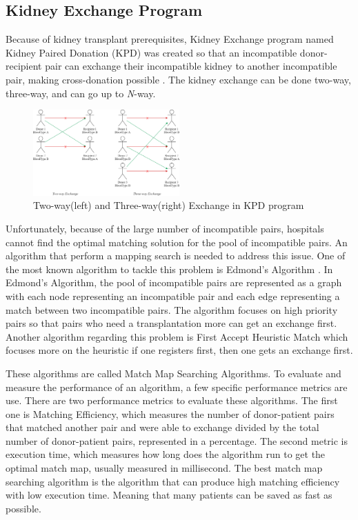 \documentclass[conference]{IEEEtran}
\begin{document}
\subsection{Kidney Exchange Program}
Because of kidney transplant prerequisites, Kidney Exchange program named Kidney Paired Donation (KPD) was created
so that an incompatible donor-recipient pair can exchange their incompatible kidney to another incompatible
pair, making cross-donation possible \cite{raja}. The kidney exchange can be done two-way, three-way, and can
go up to \textit{N}-way.

\begin{figure}[h]
\includegraphics[width=0.5\textwidth]{images/kidney-exchange.png}
\caption{Two-way(left) and Three-way(right) Exchange in KPD program}
\end{figure}

Unfortunately, because of the large number of incompatible pairs, hospitals cannot find the optimal
matching solution for the pool of incompatible pairs. An algorithm that perform a mapping search is needed
to address this issue. One of the most known algorithm to tackle this problem is Edmond's Algorithm \cite{raja}.
In Edmond's Algorithm, the pool of incompatible pairs are represented as a graph with each node representing
an incompatible pair and each edge representing a match between two incompatible pairs. The algorithm focuses on
high priority pairs so that pairs who need a transplantation more can get an exchange first.
Another algorithm regarding this problem is First Accept Heuristic Match \cite{raja} which focuses more on the
heuristic if one registers first, then one gets an exchange first.

These algorithms are called Match Map Searching Algorithms. To evaluate and measure the performance of an algorithm,
a few specific performance metrics are use\cite{tullis}. There are two performance metrics to evaluate these
algorithms. The first one is Matching Efficiency, which measures the number of donor-patient pairs that matched
another pair and were able to exchange divided by the total number of donor-patient pairs, represented in a percentage.
The second metric is execution time, which measures how long does the algorithm run to get the optimal match map,
usually measured in millisecond. The best match map searching algorithm is the algorithm that can produce high matching
efficiency with low execution time. Meaning that many patients can be saved as fast as possible.
\end{document}

